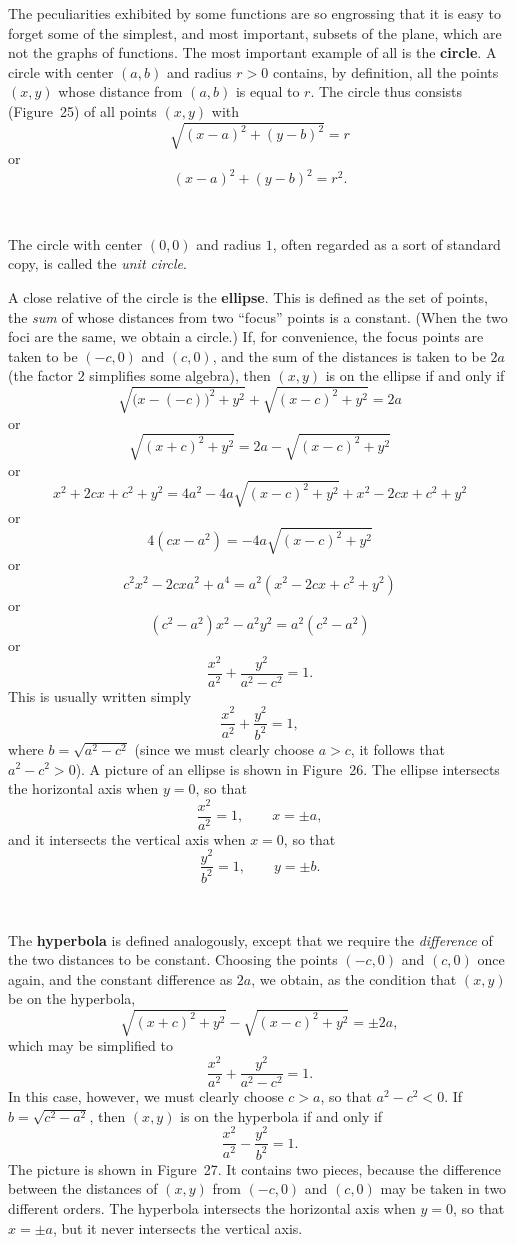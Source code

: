 The peculiarities exhibited by some functions are so engrossing that it is easy
to forget some of the simplest, and most important, subsets of the plane, which
are not the graphs of functions. The most important example of all is the
\textbf{circle}. A circle with center $(a,b)$ and radius $r>0$ contains, by
definition, all the points $(x,y)$ whose distance from $(a,b)$ is equal to $r$.
The circle thus consists (Figure~25) of all points $(x,y)$ with
\[
\sqrt{(x-a)^2+(y-b)^2}=r
\]
or
\[
(x-a)^2+(y-b)^2=r^2.
\]

\begin{center}
\\[0.6em]
\end{center}

The circle with center $(0,0)$ and radius $1$, often regarded as a sort of
standard copy, is called the \emph{unit circle}.

A close relative of the circle is the \textbf{ellipse}. This is defined as the
set of points, the \emph{sum} of whose distances from two ``focus'' points is a
constant. (When the two foci are the same, we obtain a circle.) If, for
convenience, the focus points are taken to be $(-c,0)$ and $(c,0)$, and the sum
of the distances is taken to be $2a$ (the factor $2$ simplifies some algebra),
then $(x,y)$ is on the ellipse if and only if
\[
\sqrt{\bigl(x-(-c)\bigr)^2+y^2}+\sqrt{(x-c)^2+y^2}=2a
\]
or
\[
\sqrt{(x+c)^2+y^2}=2a-\sqrt{(x-c)^2+y^2}
\]
or
\[
x^2+2cx+c^2+y^2=4a^2-4a\sqrt{(x-c)^2+y^2}+x^2-2cx+c^2+y^2
\]
or
\[
4(cx-a^2)=-4a\sqrt{(x-c)^2+y^2}
\]
or
\[
c^2x^2-2cxa^2+a^4=a^2(x^2-2cx+c^2+y^2)
\]
or
\[
(c^2-a^2)x^2-a^2y^2=a^2(c^2-a^2)
\]
or
\[
\frac{x^2}{a^2}+\frac{y^2}{a^2-c^2}=1.
\]
This is usually written simply
\[
\frac{x^2}{a^2}+\frac{y^2}{b^2}=1,
\]
where $b=\sqrt{a^2-c^2}$ (since we must clearly choose $a>c$, it follows that
$a^2-c^2>0$). A picture of an ellipse is shown in Figure~26. The ellipse
intersects the horizontal axis when $y=0$, so that
\[
\frac{x^2}{a^2}=1,\qquad x=\pm a,
\]
and it intersects the vertical axis when $x=0$, so that
\[
\frac{y^2}{b^2}=1,\qquad y=\pm b.
\]

\begin{center}
\\[0.6em]
\end{center}

The \textbf{hyperbola} is defined analogously, except that we require the
\emph{difference} of the two distances to be constant. Choosing the points
$(-c,0)$ and $(c,0)$ once again, and the constant difference as $2a$, we
obtain, as the condition that $(x,y)$ be on the hyperbola,
\[
\sqrt{(x+c)^2+y^2}-\sqrt{(x-c)^2+y^2}=\pm 2a,
\]
which may be simplified to
\[
\frac{x^2}{a^2}+\frac{y^2}{a^2-c^2}=1.
\]
In this case, however, we must clearly choose $c>a$, so that $a^2-c^2<0$. If
$b=\sqrt{c^2-a^2}$, then $(x,y)$ is on the hyperbola if and only if
\[
\frac{x^2}{a^2}-\frac{y^2}{b^2}=1.
\]
The picture is shown in Figure~27. It contains two pieces, because the
difference between the distances of $(x,y)$ from $(-c,0)$ and $(c,0)$ may be
taken in two different orders. The hyperbola intersects the horizontal axis
when $y=0$, so that $x=\pm a$, but it never intersects the vertical axis.

